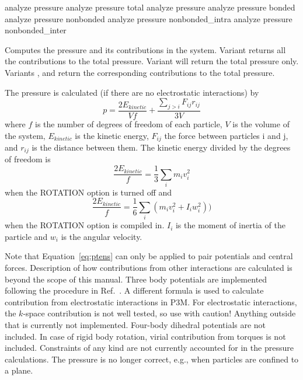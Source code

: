 \begin{essyntax}
   analyze pressure
   analyze pressure total
   analyze pressure 
   analyze pressure bonded 
   analyze pressure nonbonded  
   analyze pressure nonbonded_intra 
   analyze pressure nonbonded_inter 
\end{essyntax}

Computes the pressure and its contributions in the system. Variant
 returns all the contributions to the total pressure.
Variant  will return the total pressure only.  Variants
,  and  return the corresponding
contributions to the total pressure.



The pressure is calculated (if there are no electrostatic interactions) by 
\begin{equation}
\label{eq:ptens}
  p = \frac{2E_{kinetic}}{Vf} + \frac{\sum_{j>i} {F_{ij}r_{ij}}}{3V}
\end{equation}
where $f$ is the number of degrees of freedom of each particle, $V$
is the volume of the system, $E_{kinetic}$ is the kinetic energy, $F_{ij}$ the force between
particles i and j, and $r_{ij}$ is the distance between them.  The kinetic energy divided by the
degrees of freedom is
\begin{equation}
\frac{2E_{kinetic}}{f} = \frac{1}{3}\sum_{i} {m_{i}v_{i}^{2}}
\end {equation}
when the ROTATION option is turned off and
\begin{equation}
\frac{2E_{kinetic}}{f} = \frac{1}{6}\sum_{i}{(m_{i}v_{i}^{2} + I_{i}w_{i}^{2})})
\end{equation}
 when the ROTATION option is compiled in.  $I_{i}$ is the moment of inertia of the particle and
 $w_{i}$ is the angular velocity.

Note that Equation~\ref{eq:ptens} can only be applied to pair potentials and central forces.
Description of how contributions from other interactions are calculated is beyond the scope
of this manual. Three body potentials are implemented following the procedure in 
Ref.~\cite{thompson09a}.
A different formula is used to calculate contribution from electrostatic interactions 
in P3M. For electrostatic interactions, the $k$-space contribution is not 
well tested, so use with caution!
Anything outside that is currently not implemented.
Four-body dihedral potentials are not included.
In case of rigid body rotation, virial contribution from torques is not included.
Constraints of any kind are not currently accounted for in the pressure calculations. 
The pressure is no longer correct, e.g., when particles are confined to a plane.

